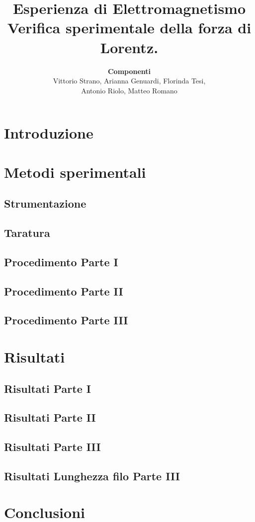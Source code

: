 \documentclass{article}
\title{\textbf{Esperienza di Elettromagnetismo}\vspace{.5em}\\ \large Verifica sperimentale della forza di Lorentz.}
\author{\textbf{Componenti}\vspace{.5em}\\ \large Vittorio Strano, Arianna Genuardi, Florinda Tesi,\\ Antonio Riolo, Matteo Romano}
\date{}
\begin{document}
\maketitle

\tableofcontents

\newpage
\section{Introduzione}
 

\section{Metodi sperimentali}
\subsection{Strumentazione}

\subsection{Taratura}

\subsection{Procedimento Parte I}

\subsection{Procedimento Parte II}


\subsection{Procedimento Parte III}


\section{Risultati}
\subsection{Risultati Parte I}\label{sec:risultati 1}


\subsection{Risultati Parte II}


\subsection{Risultati Parte III}


\subsection{Risultati Lunghezza filo Parte III}

\section{Conclusioni}

\end{document}
